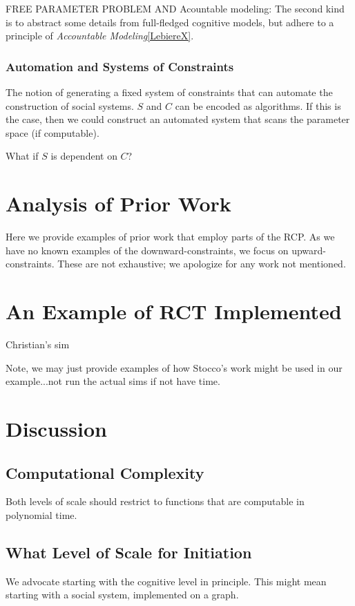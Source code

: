 \documentclass{article}
\begin{document}
FREE PARAMETER PROBLEM AND Acountable modeling:  The second kind is to abstract some details from full-fledged cognitive models, but adhere to a principle of \textit{Accountable Modeling}\ref{LebiereX}.

 


\subsubsection{Automation and Systems of Constraints}
The notion of generating a fixed system of constraints that can automate the construction of social systems.  $S$ and $C$ can be encoded as algorithms.  If this is the case, then we could construct an automated system that scans the parameter space (if computable).

What if $S$ is dependent on $C$?

\section{Analysis of Prior Work}
Here we provide examples of prior work that employ parts of the RCP.  As we have no known examples of the downward-constraints, we focus on upward-constraints.  These are not exhaustive; we apologize for any work not mentioned.  

\section{An Example of RCT Implemented}
Christian's sim

Note, we may just provide examples of how Stocco's work might be used in our example...not run the actual sims if not have time.

\section{Discussion}
\subsection{Computational Complexity}
Both levels of scale should restrict to functions that are computable in polynomial time.  

\subsection{What Level of Scale for Initiation}
We advocate starting with the cognitive level in principle.  This might mean starting with a social system, implemented on a graph. 
\end{document}

